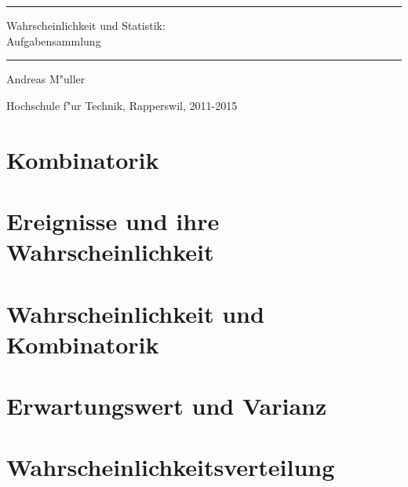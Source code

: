 \documentclass[a4paper,12pt]{book}
\begin{document}
\pagestyle{fancy}
\rhead{}
\frontmatter
\newcommand\HRule{\noindent\rule{\linewidth}{1.5pt}}
\begin{titlepage}
\HRule
\vspace*{2pt}
\begin{flushright}
{\Huge
Wahrscheinlichkeit und Statistik:\\
\bigskip
Aufgabensammlung}
\end{flushright}
\HRule
\begin{flushright}
\vspace{30pt}
\LARGE
Andreas M"uller
\end{flushright}
\begin{center}
Hochschule f"ur Technik, Rapperswil, 2011-2015
\end{center}
\end{titlepage}
\hypersetup{
        colorlinks=true,
        linktoc=all,
        linkcolor=blue
}
\tableofcontents
\newenvironment{beispiel}[1][Beispiel]{%
\begin{proof}[#1]%
\renewcommand{\qedsymbol}{$\bigcirc$}
}{\end{proof}}
\mainmatter


\chapter{Kombinatorik}

\chapter{Ereignisse und ihre Wahrscheinlichkeit}

\chapter{Wahrscheinlichkeit und Kombinatorik}

\chapter{Erwartungswert und Varianz}

\chapter{Wahrscheinlichkeitsverteilung}

\end{document}
